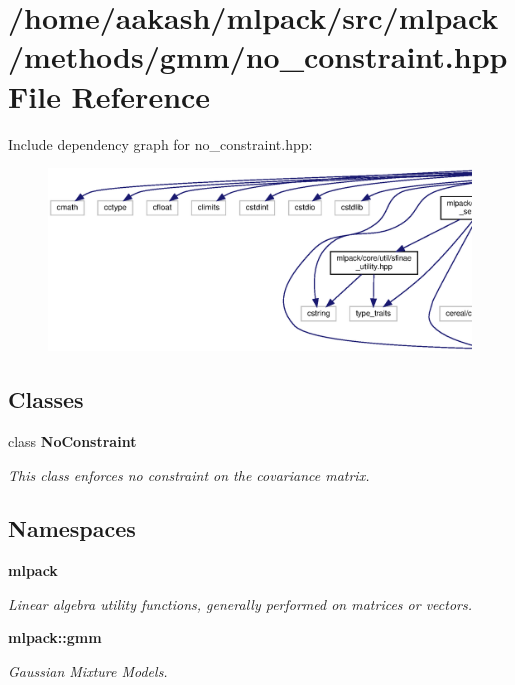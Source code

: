 \section{/home/aakash/mlpack/src/mlpack/methods/gmm/no\+\_\+constraint.hpp File Reference}
\label{no__constraint_8hpp}
Include dependency graph for no\+\_\+constraint.\+hpp\+:
\nopagebreak
\begin{figure}[H]
\begin{center}
\leavevmode
\includegraphics[width=350pt]{no__constraint_8hpp__incl}
\end{center}
\end{figure}
\subsection*{Classes}
\begin{DoxyCompactItemize}
\item 
class \textbf{ No\+Constraint}
\begin{DoxyCompactList}\small\item\em This class enforces no constraint on the covariance matrix. \end{DoxyCompactList}\end{DoxyCompactItemize}
\subsection*{Namespaces}
\begin{DoxyCompactItemize}
\item 
 \textbf{ mlpack}
\begin{DoxyCompactList}\small\item\em Linear algebra utility functions, generally performed on matrices or vectors. \end{DoxyCompactList}\item 
 \textbf{ mlpack\+::gmm}
\begin{DoxyCompactList}\small\item\em Gaussian Mixture Models. \end{DoxyCompactList}\end{DoxyCompactItemize}


